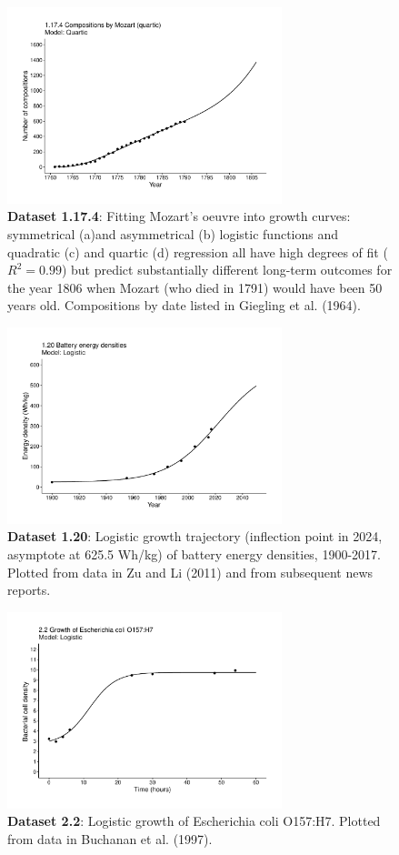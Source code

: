 \documentclass[aps,rmp,preprint,superscriptaddress,10pt,onecolumn]{article}
\begin{document}
\begin{figure}[h]
\includegraphics[width=8cm]{output/figs-ggplot/1.17.4.pdf}
\caption{\textbf{Dataset 1.17.4}: Fitting Mozart's oeuvre into growth curves: symmetrical (a)and asymmetrical (b) logistic functions and quadratic (c) and quartic (d) regression all have high degrees of fit ($R^2=0.99$) but predict substantially different long-term outcomes for the year 1806 when Mozart (who died in 1791) would have been 50 years old. Compositions by date listed in Giegling et al. (1964).}
\end{figure}
	
\begin{figure}[h]
\includegraphics[width=8cm]{output/figs-ggplot/1.20.pdf}
\caption{\textbf{Dataset 1.20}: Logistic growth trajectory (inflection point in 2024, asymptote at 625.5 Wh/kg) of battery energy densities, 1900-2017. Plotted from data in Zu and Li (2011) and from subsequent news reports. }
\end{figure}
	
\begin{figure}[h]
\includegraphics[width=8cm]{output/figs-ggplot/2.2.pdf}
\caption{\textbf{Dataset 2.2}: Logistic growth of Escherichia coli O157:H7. Plotted from data in Buchanan et al. (1997).}
\end{figure}
	
\end{document}
